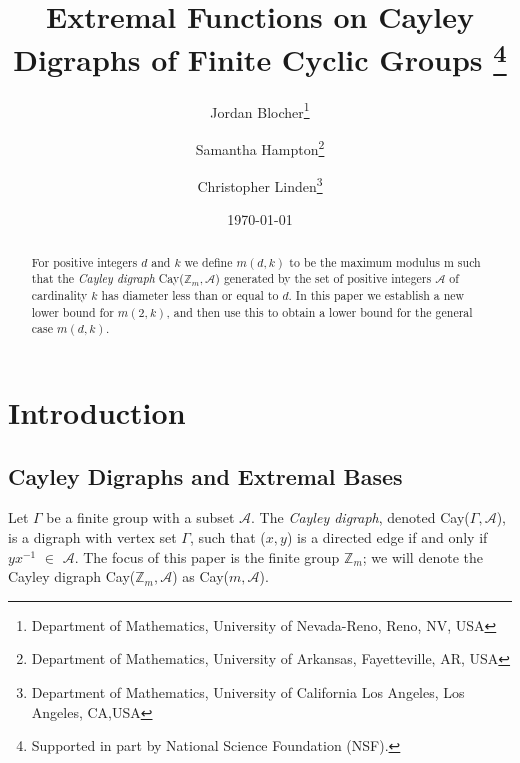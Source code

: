 \documentclass[11pt]{article}
\title{Extremal Functions on Cayley Digraphs of Finite Cyclic Groups \footnote{Supported in part by National Science Foundation (NSF).}}
\author{Jordan Blocher\thanks{Department of Mathematics, University of Nevada-Reno, Reno, NV, USA}\and Samantha Hampton\thanks{Department of Mathematics, University of Arkansas, Fayetteville, AR, USA}\and Christopher Linden\thanks{Department of Mathematics, University of California Los Angeles, Los Angeles, CA,USA } }
\date{\today}
\theoremstyle{definition}
\def\Z{\mbox{$\mathbb Z$}}
\begin{document}
 
\baselineskip6mm\parskip4mm

\maketitle

\begin{abstract}
For positive integers $d$ and $k$ we define $m(d,k)$ to be the maximum modulus m such that the \emph{Cayley digraph} Cay($\Z_{m}, \mathcal{A}$) generated by the set of positive integers $\mathcal{A}$ of cardinality $k$ has diameter less than or equal to $d$. 
In this paper we establish a new lower bound for $m(2, k)$, and then use this to obtain a lower bound for the general case $m(d,k)$.
\end{abstract}
 
\pagebreak

\section{Introduction}
\subsection{Cayley Digraphs and Extremal Bases} 
Let $\Gamma$ be a finite group with a subset $\mathcal{A}$. The \emph{Cayley digraph}, denoted Cay($\Gamma, \mathcal{A}$), is a digraph with vertex set $\Gamma$, such that ($x, y$) is a directed edge if and only if $yx^{-1}$ $\in$ $\mathcal{A}$.
The focus of this paper is the finite group $\Z_m$; we will denote the Cayley digraph Cay($\Z_m, \mathcal{A}$) as Cay($m, \mathcal{A}$).
\end{document}

